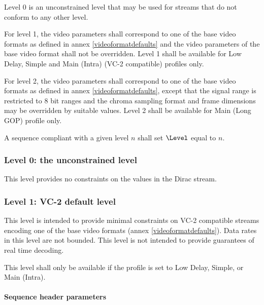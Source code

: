 Level 0 is an unconstrained level that may be used for streams that do not 
conform to any other level. 

For level 1, the video parameters shall correspond 
to one of the base video formats as defined in annex \ref{videoformatdefaults} 
and the video parameters
of the base video format shall not be overridden. Level 1 shall be available
for Low Delay, Simple and Main (Intra) (VC-2 compatible) profiles only.

For level 2, the video parameters shall correspond to one of the base video
formats as defined in annex \ref{videoformatdefaults}, 
except that the signal range is restricted
to 8 bit ranges and the chroma sampling format and frame dimensions may be
overridden by suitable values. Level 2 shall be available for Main (Long GOP)
profile only.

A sequence compliant with a given level $n$ shall set $\Level$ equal to $n$.

\subsubsection{Level 0: the unconstrained level}

This level provides no constraints on the values in the Dirac stream.

\subsubsection{Level 1: VC-2 default level}

This level is intended to provide minimal constraints on VC-2 compatible
streams encoding one of the base video formats 
(annex \ref{videoformatdefaults}). Data rates in 
this level are not bounded. This level is not intended to provide
guarantees of real time decoding.

This level shall only be available if the profile is set to Low Delay, Simple, or
Main (Intra).

\paragraph{Sequence header parameters\newline}

